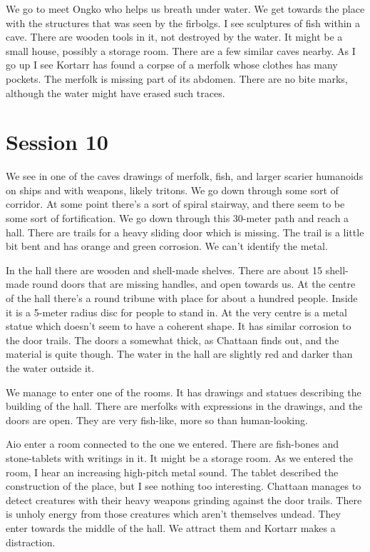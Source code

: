 \documentclass[10pt,a4paper,twoside,openany,hidelinks]{book}
\begin{document}
We go to meet Ongko who helps us breath under water. We get towards the place with the structures that was seen by the firbolgs. I see sculptures of fish within a cave. There are wooden tools in it, not destroyed by the water. It might be a small house, possibly a storage room. There are a few similar caves nearby. As I go up I see Kortarr has found a corpse of a merfolk whose clothes has many pockets. The merfolk is missing part of its abdomen. There are no bite marks, although the water might have erased such traces.

\chapter*{Session 10}

We see in one of the caves drawings of merfolk, fish, and larger scarier humanoids on ships and with weapons, likely tritons. We go down through some sort of corridor. At some point there's a sort of spiral stairway, and there seem to be some sort of fortification. We go down through this 30-meter path and reach a hall. There are trails for a heavy sliding door which is missing.
The trail is a little bit bent and has orange and green corrosion. We can't identify the metal.

In the hall there are wooden and shell-made shelves. There are about 15 shell-made round doors that are missing handles, and open towards us. At the centre of the hall there's a round tribune with place for about a hundred people. Inside it is a 5-meter radius disc for people to stand in.
At the very centre is a metal statue which doesn't seem to have a coherent shape. It has similar corrosion to the door trails.
The doors a somewhat thick, as Chattaan finds out, and the material is quite though. The water in the hall are slightly red and darker than the water outside it.

We manage to enter one of the rooms. It has drawings and statues describing the building of the hall. There are merfolks with expressions in the drawings, and the doors are open. They are very fish-like, more so than human-looking.

Aio enter a room connected to the one we entered. There are fish-bones and stone-tablets with writings in it. It might be a storage room. As we entered the room, I hear an increasing high-pitch metal sound. The tablet described the construction of the place, but I see nothing too interesting. Chattaan manages to detect creatures with their heavy weapons  grinding against the door trails.
There is unholy energy from those creatures which aren't themselves undead.
They enter towards the middle of the hall. We attract them and Kortarr makes a distraction. 
\end{document}
